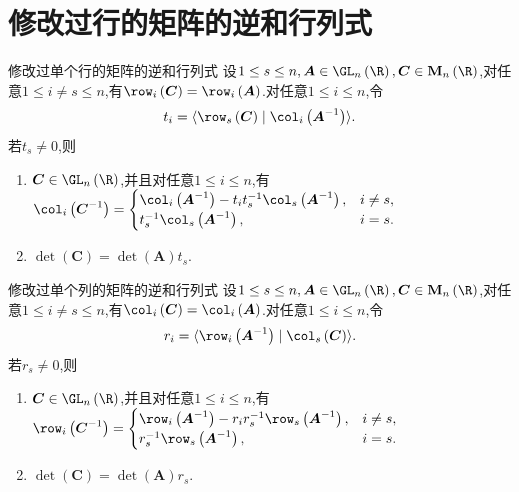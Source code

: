 \section{修改过行的矩阵的逆和行列式}

\begin{theorem}{修改过单个行的矩阵的逆和行列式}{}
	设$1\leq s\leq n,\boldsymbol{A}\in\GL_{n}\left(\R\right),\boldsymbol{C}\in\mathbf{M}_{n}\left(\R\right)$,对任意$1\leq i\neq s\leq n$,有$\row_{i}\left(\boldsymbol{C}\right)=\row_{i}\left(\boldsymbol{A}\right)$.对任意$1\leq i\leq n$,令
	\begin{align*}
		t_{i}=\langle\row_{s}\left(\boldsymbol{C}\right)\mid\col_{i}\left(\boldsymbol{A}^{-1}\right)\rangle.
	\end{align*}
	若$t_{s}\neq 0$,则
	\begin{enumerate}
		\item $\boldsymbol{C}\in\GL_{n}\left(\R\right)$,并且对任意$1\leq i\leq n$,有$\col_{i}\left(\boldsymbol{C}^{-1}\right)=
		\begin{cases}
			\col_{i}\left(\boldsymbol{A}^{-1}\right)-t_{i}t_{s}^{-1}\col_{s}\left(\boldsymbol{A}^{-1}\right),&i\neq s,\\
			t_{s}^{-1}\col_{s}\left(\boldsymbol{A}^{-1}\right),&i=s.
		\end{cases}$
		\item $\det\left(\boldsymbol{C}\right)=\det\left(\boldsymbol{A}\right)t_{s}$.
	\end{enumerate}
\end{theorem}

\begin{corollary}{修改过单个列的矩阵的逆和行列式}{}
	设$1\leq s\leq n,\boldsymbol{A}\in\GL_{n}\left(\R\right),\boldsymbol{C}\in\mathbf{M}_{n}\left(\R\right)$,对任意$1\leq i\neq s\leq n$,有$\col_{i}\left(\boldsymbol{C}\right)=\col_{i}\left(\boldsymbol{A}\right)$.对任意$1\leq i\leq n$,令
	\begin{align*}
		r_{i}=\langle\row_{i}\left(\boldsymbol{A}^{-1}\right)\mid\col_{s}\left(\boldsymbol{C}\right)\rangle.
	\end{align*}
	若$r_{s}\neq 0$,则
	\begin{enumerate}
		\item $\boldsymbol{C}\in\GL_{n}\left(\R\right)$,并且对任意$1\leq i\leq n$,有$\row_{i}\left(\boldsymbol{C}^{-1}\right)=
		\begin{cases}
			\row_{i}\left(\boldsymbol{A}^{-1}\right)-r_{i}r_{s}^{-1}\row_{s}\left(\boldsymbol{A}^{-1}\right),&i\neq s,\\
			r_{s}^{-1}\row_{s}\left(\boldsymbol{A}^{-1}\right),&i=s.
		\end{cases}$
		\item $\det\left(\boldsymbol{C}\right)=\det\left(\boldsymbol{A}\right)r_{s}$.
	\end{enumerate}
\end{corollary}